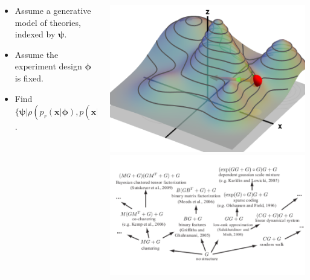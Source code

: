 \documentclass{beamer}
\newcommand{\bftheta}{{\bm \theta}}
\newcommand{\bfx}{\mathbf{x}}
\begin{document}
\begin{frame}
\begin{columns}
\begin{column}{0.7\textwidth}
            \begin{itemize}
                \item Assume a generative model of theories, indexed by $\bm \psi$.
                \item Assume the experiment design $\bm \phi$ is fixed.
                \item Find $\{ \bm \psi | \rho(p_r(\bfx | \bm \phi), p(\bfx|\bm \psi, \bm \phi, \bftheta^*)) < \epsilon \}$.
            \end{itemize}
        \end{column}
        \begin{column}{0.3\textwidth}
            \begin{center}
                \includegraphics[width=\textwidth]{figures/level.png}\\
                \includegraphics[width=\textwidth]{figures/auto2.png}
            \end{center}
        \end{column}
    \end{columns}
\end{frame}
\end{document}
